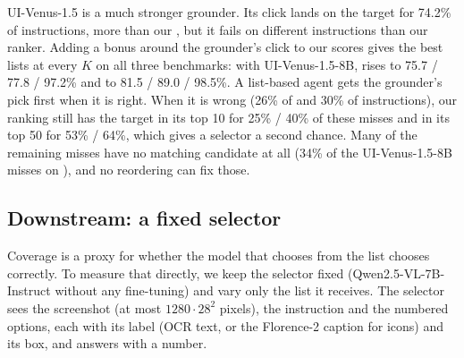 UI-Venus-1.5 is a much stronger grounder. Its click lands on the target for 74.2\% of \osw instructions, more than
our , but it fails on different instructions than our ranker. Adding a bonus around the grounder's click to
our scores gives the best lists at every $K$ on all three benchmarks: with UI-Venus-1.5-8B,  rises to 75.7
/ 77.8 / 97.2\% and  to 81.5 / 89.0 / 98.5\%. A list-based agent gets the grounder's pick first when it is
right. When it is wrong (26\% of \osw and 30\% of \sspro instructions), our ranking still has the target in its
top 10 for 25\% / 40\% of these misses and in its top 50 for 53\% / 64\%, which gives a selector a second chance.
Many of the remaining misses have no matching candidate at all (34\% of the UI-Venus-1.5-8B misses on \osw), and
no reordering can fix those.

\subsection{Downstream: a fixed selector}
\label{sec:selector}

Coverage is a proxy for whether the model that chooses from the list chooses correctly. To measure that directly,
we keep the selector fixed (Qwen2.5-VL-7B-Instruct without any fine-tuning) and vary only the list it receives. The selector
sees the screenshot (at most $1280\cdot28^2$ pixels), the instruction and the numbered options, each with its label
(OCR text, or the Florence-2 caption for icons) and its box, and answers with a number.

